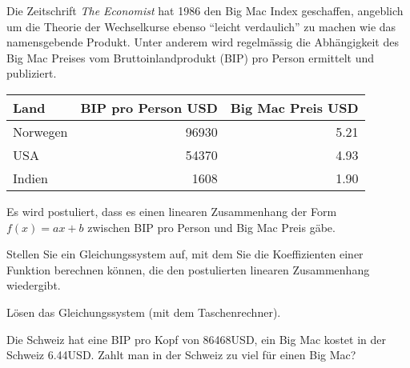 Die Zeitschrift {\em The Economist} hat 1986 den Big Mac Index geschaffen,
angeblich um die Theorie der Wechselkurse ebenso ``leicht verdaulich''
zu machen wie das namensgebende Produkt.
Unter anderem wird regelmässig die Abhängigkeit des Big Mac Preises
vom Bruttoinlandprodukt (BIP) pro Person ermittelt und publiziert.
\begin{center}
\begin{tabular}{|l|r|r|}
\hline
Land&BIP pro Person USD&Big Mac Preis USD\\
\hline
Norwegen&96930&5.21\\
USA&54370&4.93\\
Indien&1608&1.90\\
\hline
\end{tabular}
\end{center}
Es wird postuliert, dass es einen linearen Zusammenhang der Form $f(x)=ax+b$
zwischen BIP pro Person und Big Mac Preis gäbe.

\begin{teilaufgaben}
\item Stellen Sie ein Gleichungssystem auf, mit dem Sie die Koeffizienten
einer Funktion berechnen können, die den postulierten linearen Zusammenhang
wiedergibt.
\item Lösen das Gleichungssystem (mit dem Taschenrechner).
\item Die Schweiz hat eine BIP pro Kopf von 86468USD, ein Big Mac kostet
in der Schweiz 6.44USD.
Zahlt man in der Schweiz zu viel für einen Big Mac?
\end{teilaufgaben}

